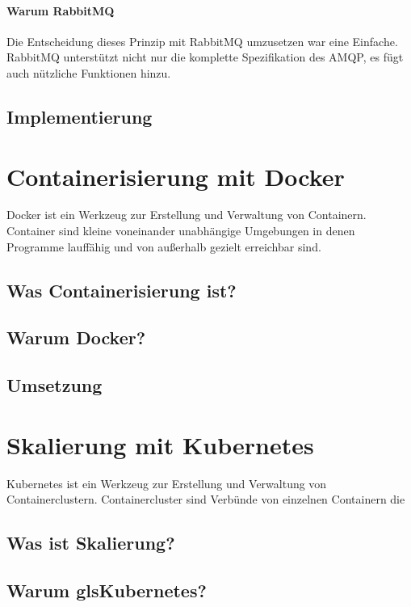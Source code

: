 \documentclass[12pt,a4paper]{article}
\begin{document}
\paragraph{Warum RabbitMQ}
Die Entscheidung dieses Prinzip mit \gls{RabbitMQ} umzusetzen war eine Einfache. \gls{RabbitMQ} unterstützt nicht nur die komplette Spezifikation des \gls{AMQP}, es fügt auch nützliche Funktionen hinzu\cite{rabExt}.

\subsection{Implementierung}

\section{Containerisierung mit \gls{Docker}} \label{docker}
Docker ist ein Werkzeug zur Erstellung und Verwaltung von Containern. Container sind kleine voneinander unabhängige Umgebungen in denen Programme lauffähig und von außerhalb gezielt erreichbar sind.

\subsection{Was Containerisierung ist?}

\subsection{Warum Docker?}

\subsection{Umsetzung}

\section{Skalierung mit \gls{Kubernetes}} \label{kubernetes}
Kubernetes ist ein Werkzeug zur Erstellung und Verwaltung von Containerclustern. Containercluster sind Verbünde von einzelnen Containern die 

\subsection{Was ist Skalierung?}

\subsection{Warum gls{Kubernetes}?} 
\end{document}
